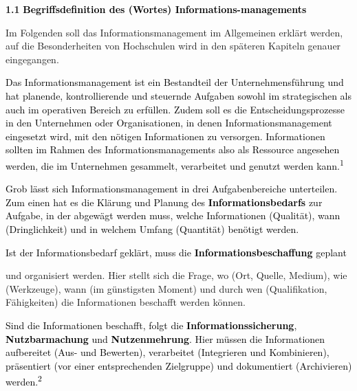\documentclass[a4paper]{article}
\title{}
\begin{document}
{\sffamily
\textbf{1.1 }\textrm{\textbf{\textcolor{black}{Begriffsdefinition des (Wortes) Informations-managements}}} }


\bigskip

{\sffamily\color{black}
Im Folgenden soll das Informationsmanagement im Allgemeinen erklärt werden, auf die Besonderheiten von Hochschulen wird
in den späteren Kapiteln genauer eingegangen.}

{\sffamily
\textcolor{black}{Das Informationsmanagement ist ein Bestandteil der Unternehmensführung und hat planende,
kontrollierende und steuernde Aufgaben sowohl im strategischen als auch im operativen Bereich zu erfüllen. Zudem soll
es die Entscheidungsprozesse in den Unternehmen oder Organisationen, in denen Informationsmanagement eingesetzt wird,
mit den nötigen Informationen zu versorgen. Informationen sollten im Rahmen des Informationsmanagements also als
Ressource angesehen werden, die im Unternehmen gesammelt, verarbeitet und genutzt werden
kann.}\textcolor{black}{\textsuperscript{1}}}


\bigskip

{\sffamily
\textcolor{black}{Grob lässt sich Informationsmanagement in drei Aufgabenbereiche unterteilen. Zum einen hat es die
Klärung und Planung des }\textbf{\textcolor{black}{Informationsbedarfs}}\textcolor{black}{ zur Aufgabe, in der abgewägt
werden muss, welche Informationen (Qualität), wann (Dringlichkeit) und in welchem Umfang (Quantität) benötigt werden.}}

{\sffamily
\textcolor{black}{Ist der Informationsbedarf geklärt, muss die
}\textbf{\textcolor{black}{Informationsbeschaffung}}\textcolor{black}{ geplant }}

{\sffamily\color{black}
und organisiert werden. Hier stellt sich die Frage, wo (Ort, Quelle, Medium), wie (Werkzeuge), wann (im günstigsten
Moment) und durch wen (Qualifikation, Fähigkeiten) die Informationen beschafft werden können.}

{\sffamily
\textcolor{black}{Sind die Informationen beschafft, folgt die
}\textbf{\textcolor{black}{Informationssicherung}}\textcolor{black}{,
}\textbf{\textcolor{black}{Nutzbarmachung}}\textcolor{black}{ und
}\textbf{\textcolor{black}{Nutzenmehrung}}\textcolor{black}{. Hier müssen die Informationen aufbereitet (Aus- und
Bewerten), verarbeitet (Integrieren und Kombinieren), präsentiert (vor einer entsprechenden Zielgruppe) und
dokumentiert (Archivieren) werden.}\textcolor{black}{\textsuperscript{2}}}


\bigskip
\end{document}
